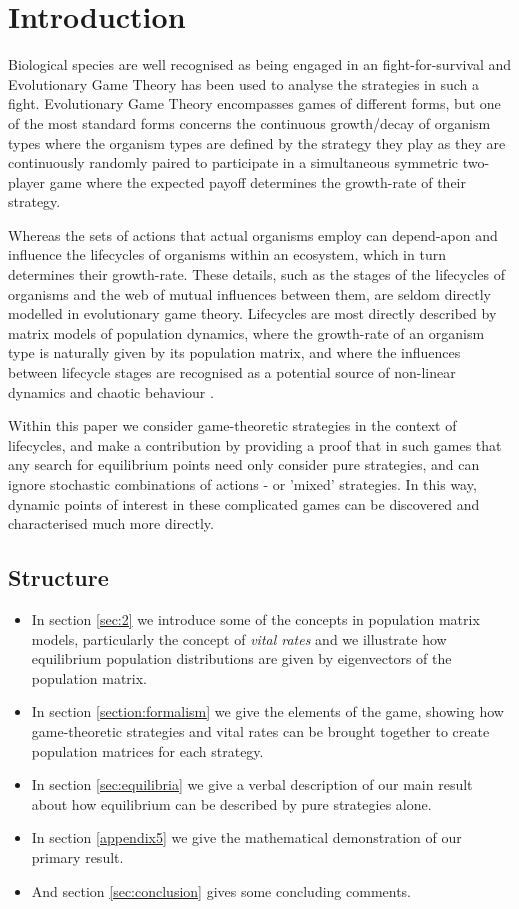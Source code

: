 
\section{Introduction}
Biological species are well recognised as being engaged in an fight-for-survival and Evolutionary Game Theory has been used to analyse the strategies in such a fight.
Evolutionary Game Theory encompasses games of different forms, but one of the most standard forms concerns the continuous growth/decay of organism types where the organism types are defined by the strategy they play as they are continuously randomly paired to participate in a simultaneous symmetric two-player game where the expected payoff determines the growth-rate of their strategy.\cite{maynard,maynard2,weibull}

Whereas the sets of actions that actual organisms employ can depend-apon and influence the lifecycles of organisms within an ecosystem, which in turn determines their growth-rate.
These details, such as the stages of the lifecycles of organisms and the web of mutual influences between them, are seldom directly modelled in evolutionary game theory.
Lifecycles are most directly described by matrix models of population dynamics, where the growth-rate of an organism type is naturally given by its population matrix, and where the influences between lifecycle stages are recognised as a potential source of non-linear dynamics and chaotic behaviour \cite{doi:10.1080/10236198.2019.1699916, DEVRIES2020108875, population1}.

Within this paper we consider game-theoretic strategies in the context of lifecycles, and make a contribution by providing a proof that in such games that any search for equilibrium points need only consider pure strategies, and can ignore stochastic combinations of actions - or 'mixed' strategies.
In this way, dynamic points of interest in these complicated games can be discovered and characterised much more directly.

\subsection{Structure}
\begin{itemize}
\item In section \ref{sec:2} we introduce some of the concepts in population matrix models, particularly the concept of \textit{vital rates} and we illustrate how equilibrium population distributions are given by eigenvectors of the population matrix.
\item In section \ref{section:formalism} we give the elements of the game, showing how game-theoretic strategies and vital rates can be brought together to create population matrices for each strategy.
\item In section \ref{sec:equilibria} we give a verbal description of our main result about how equilibrium can be described by pure strategies alone.
\item In section \ref{appendix5} we give the mathematical demonstration of our primary result.
\item And section \ref{sec:conclusion} gives some concluding comments.
\end{itemize}



